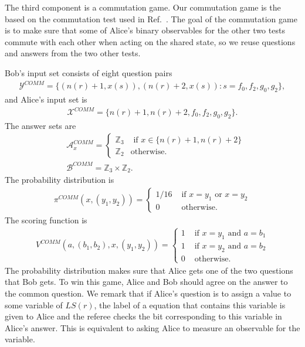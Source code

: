 \documentclass[11pt,letterpaper]{article}
\newcommand{\Z}{\mathbb{Z}}
\newcommand{\calX}{\mathcal{X}}
\newcommand{\calY}{\mathcal{Y}}
\newcommand{\calA}{\mathcal{A}}
\newcommand{\calB}{\mathcal{B}}
\newcommand{\1}{\mathbb{1}}
\newcommand{\LS}{LS}
\newcommand{\COMM}{COMM}
\newcommand{\nr}{n(r)}
\theoremstyle{definition}
\begin{document}
The third component is a commutation game.
Our commutation game is the based on the commutation test used in Ref.~\cite{coladan2017verifier}.
The goal of the commutation game is to make sure that some
of Alice's binary observables for the other two tests 
commute with each other when acting on the shared state,
so we reuse questions and answers from the two other tests.

Bob's input set consists of eight question pairs
\begin{align*}
    \calY^{\COMM} = \{(\nr+1, x(s)), (\nr+2, x(s)): s = f_0, f_2, g_0, g_2 \},
\end{align*}
and
Alice's input set is 
\begin{align*}
    \calX^{\COMM} = \{\nr+1, \nr+2, f_0, f_2, g_0, g_2\}.
\end{align*}
The answer sets are 
\begin{align*}
    &\calA^{\COMM}_x = 
    \begin{cases}
    \Z_3 &\text{ if } x \in \{\nr+1, \nr+2\} \\
    \Z_2 &\text{otherwise.}
    \end{cases}
    \\
    &\calB^{\COMM} = \Z_3 \times \Z_2.
\end{align*}
The probability distribution is
\begin{align*}
    \pi^{\COMM}(x,(y_1,y_2)) =
    \begin{cases}
        1/16 &\text{ if } x = y_1 \text{ or } x = y_2 \\
        0   &\text{ otherwise}.
    \end{cases}
\end{align*}
The scoring function is
\begin{align*}
    V^{\COMM}(a, (b_1,b_2), x, (y_1,y_2)) = 
    \begin{cases}
    1 &\text{ if } x = y_1 \text{ and } a = b_1 \\
    1 &\text{ if } x = y_2 \text{ and } a = b_2 \\
    0 &\text{ otherwise}.
    \end{cases}
\end{align*}
The probability distribution makes sure that Alice gets one of
the two questions that Bob gets.
To win this game, Alice and Bob should agree on the answer to the
common question.
We remark that if Alice's question is to assign a value to some variable of $\LS(r)$,
the label of a equation that contains this variable is given 
to Alice and the referee checks the bit corresponding to this
variable in Alice's answer. This is equivalent to asking 
Alice to measure an observable for the variable.
\end{document}
